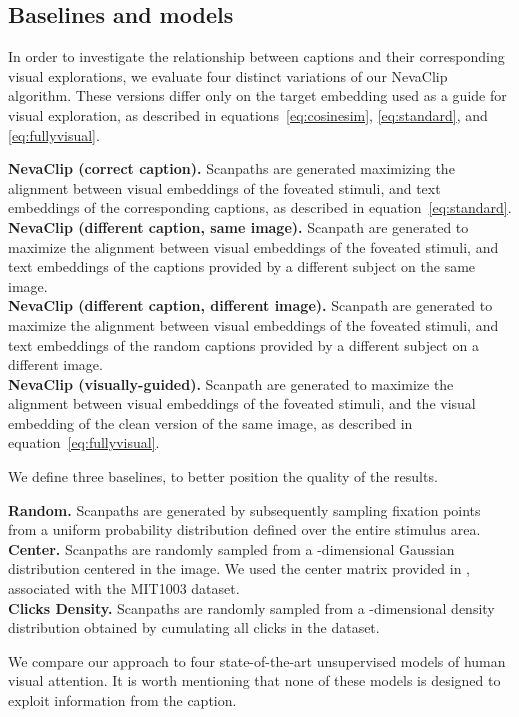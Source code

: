 \documentclass{article}
\begin{document}
\subsection{Baselines and models}
In order to investigate the relationship between captions and their corresponding visual explorations, we evaluate four distinct variations of our NevaClip algorithm. These versions differ only on the target embedding used as a guide for visual exploration, as described in equations~\ref{eq:cosinesim}, \ref{eq:standard}, and \ref{eq:fullyvisual}.

\textbf{NevaClip (correct caption).} Scanpaths are generated maximizing the alignment between visual embeddings of the foveated stimuli, and text embeddings of the corresponding captions, as described in equation~\ref{eq:standard}.\\
\textbf{NevaClip (different caption, same image). }Scanpath are generated to maximize the alignment between visual embeddings of the foveated stimuli, and text embeddings of the captions provided by a different subject on the same image.\\
\textbf{NevaClip (different caption, different image).} Scanpath are generated to maximize the alignment between visual embeddings of the foveated stimuli, and text embeddings of the random captions provided by a different subject on a different image.\\
\textbf{NevaClip (visually-guided).} Scanpath are generated to maximize the alignment between visual embeddings of the foveated stimuli, and the visual embedding of the clean version of the same image, as described in equation~\ref{eq:fullyvisual}.

We define three baselines, to better position the quality of the results.

\textbf{Random.} Scanpaths are generated by subsequently sampling fixation points from a uniform probability distribution defined over the entire stimulus area.\\
\textbf{Center.} Scanpaths are randomly sampled from a -dimensional Gaussian distribution centered in the image. We used the center matrix provided in \citet{judd2009learning}, associated with the MIT1003 dataset.\\
\textbf{Clicks Density.} Scanpaths are randomly sampled from a -dimensional density distribution obtained by cumulating all clicks in the dataset.

We compare our approach to four state-of-the-art unsupervised models of human visual attention. It is worth mentioning that none of these models is designed to exploit information from the caption.
\end{document}
